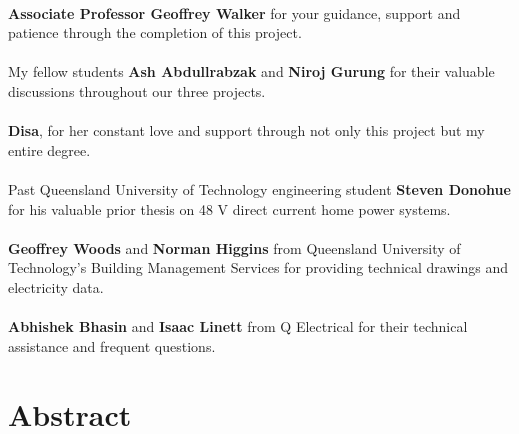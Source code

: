 \paragraph{}
\textbf{Associate Professor Geoffrey Walker} for your guidance, support and patience through the completion of this project. 

\paragraph{}
My fellow students \textbf{Ash Abdullrabzak} and \textbf{Niroj Gurung} for their valuable discussions throughout our three projects. 

\paragraph{}
\textbf{Disa}, for her constant love and support through not only this project but my entire degree.    

\paragraph{}
Past Queensland University of Technology engineering student \textbf{Steven Donohue} for his valuable prior thesis on 48 V direct current home power systems.  

\paragraph{}
\textbf{Geoffrey Woods} and \textbf{Norman Higgins} from Queensland University of Technology's Building Management Services for providing technical drawings and electricity data.

\paragraph{}
\textbf{Abhishek Bhasin} and \textbf{Isaac Linett} from Q Electrical for their technical assistance and frequent questions.

\newpage


\section*{Abstract}

